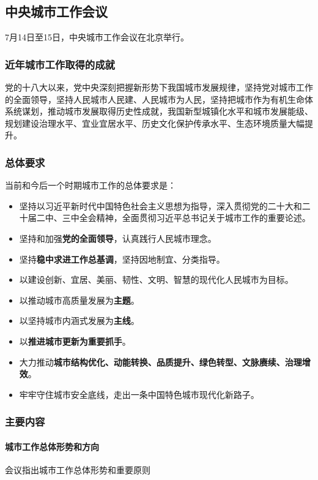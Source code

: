 \subsection{中央城市工作会议}

7月14日至15日，中央城市工作会议在北京举行。

\subsubsection{近年城市工作取得的成就}

党的十八大以来，党中央深刻把握新形势下我国城市发展规律，坚持党对城市工作的全面领导，坚持人民城市人民建、人民城市为人民，坚持把城市作为有机生命体系统谋划，推动城市发展取得历史性成就，我国新型城镇化水平和城市发展能级、规划建设治理水平、宜业宜居水平、历史文化保护传承水平、生态环境质量大幅提升。

\subsubsection{总体要求}

当前和今后一个时期城市工作的总体要求是：

\begin{itemize}
    \item 坚持以习近平新时代中国特色社会主义思想为指导，深入贯彻党的二十大和二十届二中、三中全会精神，全面贯彻习近平总书记关于城市工作的重要论述。
    \item 坚持和加强\textbf{党的全面领导}，认真践行人民城市理念。
    \item 坚持\textbf{稳中求进工作总基调}，坚持因地制宜、分类指导。
    \item 以建设创新、宜居、美丽、韧性、文明、智慧的现代化人民城市为目标。
    \item 以推动城市高质量发展为\textbf{主题}。
    \item 以坚持城市内涵式发展为\textbf{主线}。
    \item 以\textbf{推进城市更新为重要抓手}。
    \item 大力推动\textbf{城市结构优化、动能转换、品质提升、绿色转型、文脉赓续、治理增效}。
    \item 牢牢守住城市安全底线，走出一条中国特色城市现代化新路子。
\end{itemize}

\subsubsection{主要内容}

\paragraph{城市工作总体形势和方向} 会议指出城市工作总体形势和重要原则

